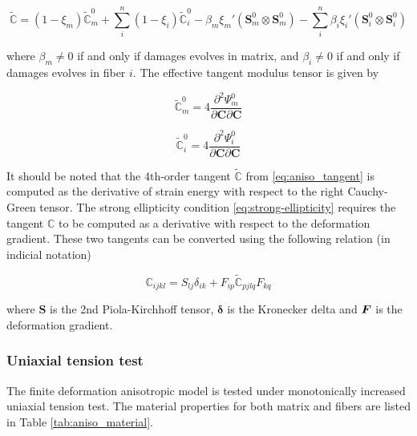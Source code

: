 \documentclass[12pt]{article}
\newcommand{\mbs}[1]{\boldsymbol{#1}}
\def\bS{{\mbs{S}}} \def\bT{{\mbs{T}}} \def\bU{{\mbs{U}}}
\def\bdelta{{\mbs{\delta}}}
\newcommand{\tensor}[1]{\ensuremath{\boldsymbol{#1}}}
\numberwithin{equation}{section}
\begin{document}
\begin{equation}\label{eq:aniso_tangent}
  \tilde{\mathbb{C}} 
   = (1-\xi_m)\tilde{\mathbb{C}}_m^0 
   + \sum_i^n (1-\xi_i) \tilde{\mathbb{C}}_i^0
   -\beta_m \xi_m' (\bS_m^0 \otimes \bS_m^0 )
   - \sum_i^n \beta_i \xi_i' (\bS_i^0 \otimes \bS_i^0 )
\end{equation}

where $\beta_m\neq 0$ if and only if damages evolves in matrix, and
$\beta_i \neq 0$ if and only if damages evolves in fiber $i$. The 
effective tangent modulus tensor is given by

\begin{equation}\label{eq:aniso_tangent1}
  \tilde{\mathbb{C}}_m^0 = 
    4\frac{\partial ^2 \Psi_m^0}{\partial\tensor C \partial\tensor C}
\end{equation}

\begin{equation}\label{eq:aniso_tangent2}
  \tilde{\mathbb{C}}_i^0 =  
    4 \frac{\partial ^2 \Psi_i^0}{\partial\tensor C \partial\tensor C}
\end{equation}

It should be noted that the 4th-order tangent $\tilde{\mathbb{C}}$ 
from \eqref{eq:aniso_tangent} is computed as the derivative of strain 
energy with respect to the right Cauchy-Green tensor. The strong 
ellipticity condition \eqref{eq:strong-ellipticity} requires the 
tangent $\mathbb{C}$ to be computed as a derivative with respect to 
the deformation gradient. These two tangents can be converted using 
the following relation (in indicial notation)

\begin{equation}
  \mathbb{C}_{ijkl} = S_{lj}\delta_{ik}
    + F_{ip} \tilde{\mathbb{C}}_{pjlq} F_{kq}
\end{equation}

where $\bS$ is the 2nd Piola-Kirchhoff tensor, $\bdelta$ is the 
Kronecker delta and $\bF$ is the deformation gradient.

\subsubsection{Uniaxial tension test}

The finite deformation anisotropic model is tested under monotonically
increased uniaxial tension test. The material properties for both 
matrix and fibers are listed in Table \ref{tab:aniso_material}.
\end{document}
